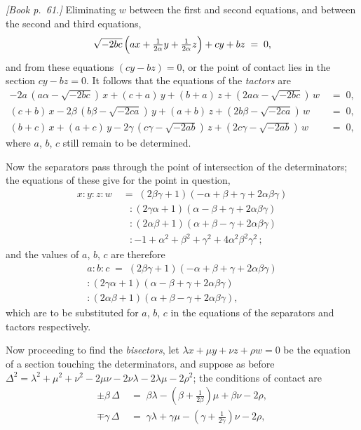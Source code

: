 \documentclass[11pt]{article}
\begin{document}
\noindent\emph{[Book p.~61.]} Eliminating $w$ between the first and second equations, and between the second and third equations,
\[
\sqrt{-2bc}\,\Bigl(ax + \tfrac{1}{2\alpha}y + \tfrac{1}{2\alpha}z\Bigr) + cy + bz \;=\; 0,
\]
and from these equations $(cy - bz) = 0$, or the point of contact lies in the section $cy - bz = 0$. It follows that the equations of the \emph{tactors} are
\begin{align*}
-2a\,(a\alpha - \sqrt{-2bc})\,x + (c + a)\,y + (b + a)\,z + (2a\alpha - \sqrt{-2bc})\,w &\;=\; 0,\\
(c + b)\,x - 2\beta\,(b\beta - \sqrt{-2ca})\,y + (a + b)\,z + (2b\beta - \sqrt{-2ca})\,w &\;=\; 0,\\
(b + c)\,x + (a + c)\,y - 2\gamma\,(c\gamma - \sqrt{-2ab})\,z + (2c\gamma - \sqrt{-2ab})\,w &\;=\; 0,
\end{align*}
where $a$, $b$, $c$ still remain to be determined.

\medskip

Now the separators pass through the point of intersection of the determinators; the equations of these give for the point in question,
\begin{align*}
x : y : z : w &\;=\; (2\beta\gamma + 1)(-\alpha + \beta + \gamma + 2\alpha\beta\gamma)\\
              &\quad : (2\gamma\alpha + 1)( \alpha - \beta + \gamma + 2\alpha\beta\gamma)\\
              &\quad : (2\alpha\beta + 1)( \alpha + \beta - \gamma + 2\alpha\beta\gamma)\\
              &\quad : -1 + \alpha^{2} + \beta^{2} + \gamma^{2} + 4\alpha^{2}\beta^{2}\gamma^{2}\,;
\end{align*}
and the values of $a$, $b$, $c$ are therefore
\begin{align*}
a : b : c \;=\; (2\beta\gamma + 1)(-\alpha + \beta + \gamma + 2\alpha\beta\gamma)\\
            : (2\gamma\alpha + 1)( \alpha - \beta + \gamma + 2\alpha\beta\gamma)\\
            : (2\alpha\beta + 1)( \alpha + \beta - \gamma + 2\alpha\beta\gamma),
\end{align*}
which are to be substituted for $a$, $b$, $c$ in the equations of the separators and tactors respectively.

\medskip

Now proceeding to find the \emph{bisectors}, let $\lambda x + \mu y + \nu z + \rho w = 0$ be the equation of a section touching the determinators, and suppose as before $\Delta^{2} = \lambda^{2} + \mu^{2} + \nu^{2} - 2\mu\nu - 2\nu\lambda - 2\lambda\mu - 2\rho^{2}$; the conditions of contact are
\begin{align*}
\pm\beta\,\Delta &\;=\; \beta\lambda - (\beta + \tfrac{1}{2\beta})\mu + \beta\nu - 2\rho,\\
\mp\gamma\,\Delta &\;=\; \gamma\lambda + \gamma\mu - (\gamma + \tfrac{1}{2\gamma})\nu - 2\rho,
\end{align*}
\end{document}
